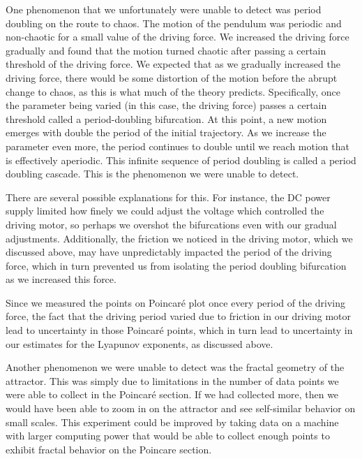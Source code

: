 \documentclass[twocolumn,amsmath,amssymb,pra, floatfix]{revtex4-2}
\begin{document}
One phenomenon that we unfortunately were unable to detect was period doubling on the route to chaos. The motion of the pendulum was periodic and non-chaotic for a small value of the driving force. We increased the driving force gradually and found that the motion turned chaotic after passing a certain threshold of the driving force. We expected that as we gradually increased the driving force, there would be some distortion of the motion before the abrupt change to chaos, as this is what much of the theory predicts. Specifically, once the parameter being varied (in this case, the driving force) passes a certain threshold called a period-doubling bifurcation. At this point, a new motion emerges with double the period of the initial trajectory. As we increase the parameter even more, the period continues to double until we reach motion that is effectively aperiodic. This infinite sequence of period doubling is called a period doubling cascade. This is the phenomenon we were unable to detect. 

There are several possible explanations for this. For instance, the DC power supply limited how finely we could adjust the voltage which controlled the driving motor, so perhaps we overshot the bifurcations even with our gradual adjustments. Additionally, the friction we noticed in the driving motor, which we discussed above, may have unpredictably impacted the period of the driving force, which in turn prevented us from isolating the period doubling bifurcation as we increased this force. 

Since we measured the points on Poincar\'{e} plot once every period of the driving force, the fact that the driving period varied due to friction in our driving motor lead to uncertainty in those Poincar\'{e} points, which in turn lead to uncertainty in our estimates for the Lyapunov exponents, as discussed above.  

Another phenomenon we were unable to detect was the fractal geometry of the attractor. This was simply due to limitations in the number of data points we were able to collect in the Poincar\'{e} section. If we had collected more, then we would have been able to zoom in on the attractor and see self-similar behavior on small scales. This experiment could be improved by taking data on a machine with larger computing power that would be able to collect enough points to exhibit fractal behavior on the Poincare section. 
\end{document}
